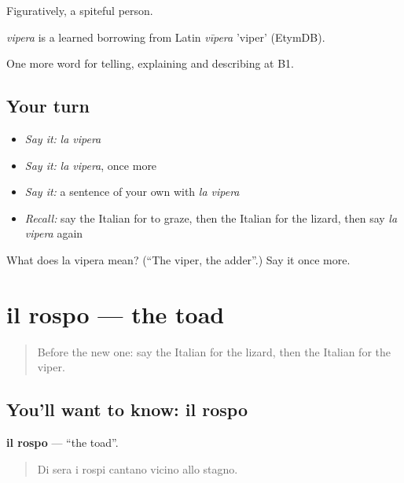 Figuratively, a spiteful person.

\begin{cousinweb}
\emph{vipera} is a learned borrowing from Latin \emph{vīpera} 'viper' (EtymDB).
\end{cousinweb}

\begin{grammarlens}[title={What you've built}]
One more word for telling, explaining and describing at B1.
\end{grammarlens}

\subsection*{Your turn}
\begin{itemize}
\raggedright
  \item \emph{Say it:} \emph{la vipera}
  \item \emph{Say it:} \emph{la vipera}, once more
  \item \emph{Say it:} a sentence of your own with \emph{la vipera}
  \item \emph{Recall:} say the Italian for to graze, then the Italian for the lizard, then say \emph{la vipera} again
\end{itemize}

\begin{tcolorbox}[breakable,colback=teal!4,colframe=teal!35!black,title={Before you move on}]
What does la vipera mean? (\textquotedblleft{}The viper, the adder\textquotedblright{}.) Say it once more.
\end{tcolorbox}
\section[il rospo]{il rospo — the toad}

\label{lesson:IT-C465-rospo}



\begin{quote}
Before the new one: say the Italian for the lizard, then the Italian for the viper.
\end{quote}

\subsection*{You'll want to know: il rospo}
\textbf{il rospo} — \textquotedblleft{}the toad\textquotedblright{}.

\begin{quote}
Di sera i rospi cantano vicino allo stagno.
\end{quote}

